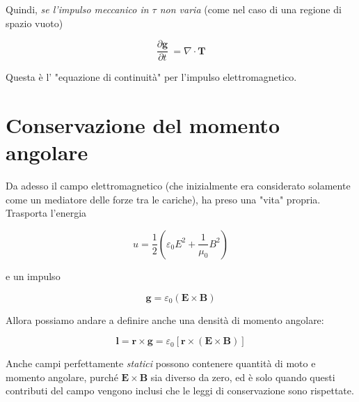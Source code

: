 Quindi, \emph{se l'impulso meccanico in $\tau$ non varia} (come nel caso di una regione di spazio vuoto)

\begin{tcolorbox}[colback=yellow!10!white, colframe=orange!70!black, boxrule=0.8pt]
\begin{equation}
    \frac{\partial \mathbf{g}}{\partial t} \ = \nabla \cdot \mathbf{T} 
 \end{equation}
\end{tcolorbox}

Questa è l' "equazione di continuità" per l'impulso elettromagnetico. 

\section{Conservazione del momento angolare}

Da adesso il campo elettromagnetico (che inizialmente era considerato solamente come un mediatore delle forze tra le cariche), ha preso una "vita" propria.
Trasporta l'energia 

\begin{equation*}
    u = \frac{1}{2} \left( \varepsilon_0 E^2 + \frac{1}{\mu_0}B^2 \right)
\end{equation*}

e un impulso 

\begin{equation*}
    \mathbf{g} = \varepsilon_0 (\mathbf{E} \times \mathbf{B})
\end{equation*}

Allora possiamo andare a definire anche una densità di momento angolare: 

\begin{tcolorbox}[colback=yellow!10!white, colframe=orange!70!black, boxrule=0.8pt]
\begin{equation}
    \mathbf{l} = \mathbf{r} \times \mathbf{g} = \varepsilon_0 [\mathbf{r} \times (\mathbf{E} \times \mathbf{B})]
\end{equation}
\end{tcolorbox}

Anche campi perfettamente \textit{statici} possono contenere quantità di moto e momento angolare, purché $\mathbf{E} \times \mathbf{B}$ sia diverso da zero, ed è solo quando questi contributi del campo vengono inclusi che le leggi di conservazione sono rispettate.